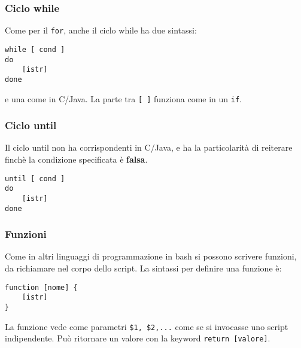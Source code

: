 \documentclass[a4paper, 10pt]{article}
\begin{document}
\subsubsection{Ciclo while}
Come per il \verb|for|, anche il ciclo while ha due sintassi:
\begin{verbatim}
while [ cond ]
do
    [istr]
done
\end{verbatim}
e una come in C/Java. La parte tra \verb|[ ]| funziona come in un \verb|if|.

\subsubsection{Ciclo until}
Il ciclo until non ha corrispondenti in C/Java, e ha la particolarità di reiterare finchè la condizione specificata è \textbf{falsa}.
\begin{verbatim}
until [ cond ]
do
    [istr]
done
\end{verbatim}

\subsubsection{Funzioni}
Come in altri linguaggi di programmazione in bash si possono scrivere funzioni, da richiamare nel corpo dello script.
La sintassi per definire una funzione è:
\begin{verbatim}
function [nome] {
    [istr]
}
\end{verbatim}
La funzione vede come parametri \verb|$1, $2,...| come se si invocasse uno script indipendente. Può ritornare un valore con la keyword \verb|return [valore]|.
\end{document}
